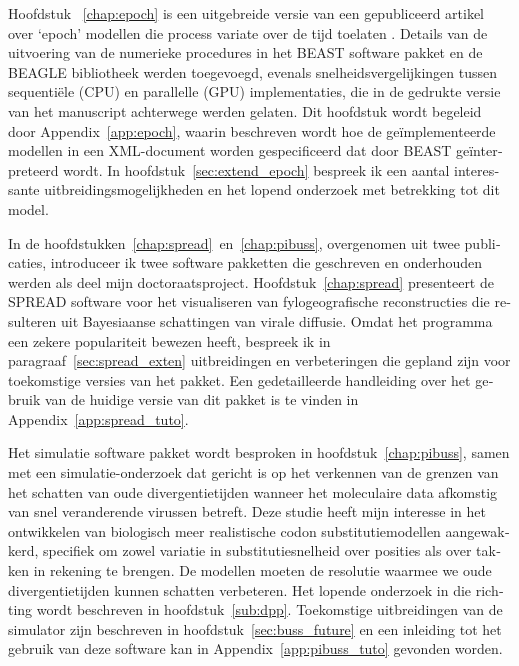 \begin{otherlanguage}{dutch}
Hoofdstuk ~\ref{chap:epoch} is een uitgebreide versie van een gepubliceerd artikel over `epoch' modellen die process variate over de tijd toelaten \citep{Bielejec2014a}.
Details van de uitvoering van de numerieke procedures in het BEAST software pakket en de BEAGLE bibliotheek werden toegevoegd, evenals snelheidsvergelijkingen tussen sequenti\"ele (CPU) en parallelle (GPU) implementaties, die in de gedrukte versie van het manuscript achterwege werden gelaten.
Dit hoofdstuk wordt begeleid door Appendix~\ref{app:epoch}, waarin beschreven wordt hoe de ge\"implementeerde modellen in een XML-document worden gespecificeerd dat door BEAST ge\"interpreteerd wordt.
In hoofdstuk~\ref{sec:extend_epoch} bespreek ik een aantal interessante uitbreidingsmogelijkheden en het lopend onderzoek met betrekking tot dit model.

In de hoofdstukken~\ref{chap:spread}~en~\ref{chap:pibuss}, overgenomen uit twee publicaties, introduceer ik twee software pakketten die geschreven en onderhouden werden als deel mijn doctoraatsproject.
Hoofdstuk~\ref{chap:spread} presenteert de SPREAD software voor het visualiseren van fylogeografische reconstructies die resulteren uit Bayesiaanse schattingen van virale diffusie.
Omdat het programma een zekere populariteit bewezen heeft, bespreek ik in paragraaf~\ref{sec:spread_exten} uitbreidingen en verbeteringen die  gepland zijn voor toekomstige versies van het pakket.
Een gedetailleerde handleiding over het gebruik van de huidige versie van dit pakket is te vinden in Appendix~\ref{app:spread_tuto}.

Het simulatie software pakket {\bussname} wordt besproken in hoofdstuk~\ref{chap:pibuss}, samen met een simulatie-onderzoek dat gericht is op het verkennen van de grenzen van het schatten van oude divergentietijden wanneer het moleculaire data afkomstig van snel veranderende virussen betreft.
Deze studie heeft mijn interesse in het ontwikkelen van biologisch meer realistische codon substitutiemodellen aangewakkerd, specifiek om zowel variatie in substitutiesnelheid over posities als over takken in rekening te brengen.
De modellen moeten de resolutie waarmee we oude divergentietijden kunnen schatten verbeteren. %
Het lopende onderzoek in die richting wordt beschreven in hoofdstuk~\ref{sub:dpp}.
Toekomstige uitbreidingen van de {\bussname} simulator zijn beschreven in hoofdstuk~\ref{sec:buss_future} en een inleiding tot het gebruik van deze software kan in Appendix~\ref{app:pibuss_tuto} gevonden worden.


\end{otherlanguage}
